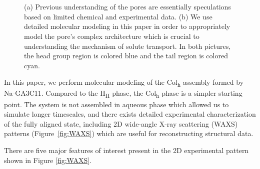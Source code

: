 \documentclass[journal=jpcbfk,manuscript=article]{achemso}
\begin{document}
\begin{figure}[!htb]
\begin{subfigure}{0.45\linewidth}
		\caption{}~\label{fig:detailed_pore}
	\end{subfigure}
    \caption{(a) Previous understanding of the pores are essentially speculations 
    based on limited chemical and experimental data. (b) We use detailed molecular 
    modeling in this paper in order to appropriately model the pore's complex architecture
    which is crucial to understanding the mechanism of solute transport. In both 
    pictures, the head group region is colored blue and the tail region is colored cyan.}~\label{fig:detail}
  \end{figure}
 
  In this paper, we perform molecular modeling of the Col\textsubscript{h}
  assembly formed by Na-GA3C11. Compared to the H\textsubscript{II} phase, the
  Col\textsubscript{h} phase is a simpler starting point. The system is not
  assembled in aqueous phase which allowed us to simulate longer timescales, and
  there exists detailed experimental characterization of the fully aligned state,
  including 2D wide-angle X-ray scattering (WAXS) patterns
  (Figure~\ref{fig:WAXS}) which are useful for reconstructing structural data. 
  
  
  There are five major features of interest present in the 2D experimental pattern shown 
  in Figure \ref{fig:WAXS}.
\end{document}
